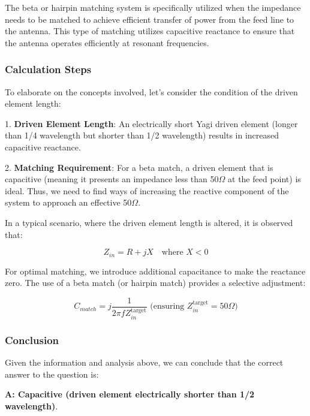 The beta or hairpin matching system is specifically utilized when the impedance needs to be matched to achieve efficient transfer of power from the feed line to the antenna. This type of matching utilizes capacitive reactance to ensure that the antenna operates efficiently at resonant frequencies.

\subsubsection*{Calculation Steps}

To elaborate on the concepts involved, let's consider the condition of the driven element length:

1. \textbf{Driven Element Length}: An electrically short Yagi driven element (longer than 1/4 wavelength but shorter than 1/2 wavelength) results in increased capacitive reactance. 

2. \textbf{Matching Requirement}: For a beta match, a driven element that is capacitive (meaning it presents an impedance less than 50$\Omega$ at the feed point) is ideal. Thus, we need to find ways of increasing the reactive component of the system to approach an effective 50$\Omega$.

In a typical scenario, where the driven element length is altered, it is observed that:

\[
    Z_{in} = R + jX \quad \text{where } X < 0
\]

For optimal matching, we introduce additional capacitance to make the reactance zero. The use of a beta match (or hairpin match) provides a selective adjustment:

\[
    C_{match} = j\frac{1}{2\pi f Z_{in}^{\text{target}}} \text{ (ensuring } Z_{in}^{\text{target}} = 50 \Omega\text{)}
\]

\subsubsection*{Conclusion}

Given the information and analysis above, we can conclude that the correct answer to the question is:

\textbf{A: Capacitive (driven element electrically shorter than 1/2 wavelength)}.



